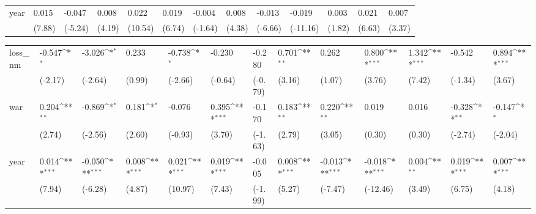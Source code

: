 \begin{tabular}{p{1.5cm} p{1.7cm} p{1.7cm} p{1.7cm} p{1.7cm} p{1.7cm} p{1.7cm} p{1.7cm} p{1.7cm} p{1.7cm} p{1.7cm} p{1.7cm} p{1.7cm}}
year            &    0.015\sym{***}&   -0.047\sym{***}&    0.008\sym{***}&    0.022\sym{***}&    0.019\sym{***}&   -0.004         &    0.008\sym{***}&   -0.013\sym{***}&   -0.019\sym{***}&    0.003         &    0.021\sym{***}&    0.007\sym{**} \\
                &   (7.88)         &  (-5.24)         &   (4.19)         &  (10.54)         &   (6.74)         &  (-1.64)         &   (4.38)         &  (-6.66)         & (-11.16)         &   (1.82)         &   (6.63)         &   (3.37)         \\
\end{tabular}
\def\sym#1{\ifmmode^{#1}\else\(^{#1}\)\fi}
\begin{tabular}{p{1.5cm} p{1.7cm} p{1.7cm} p{1.7cm} p{1.7cm} p{1.7cm} p{1.7cm} p{1.7cm} p{1.7cm} p{1.7cm} p{1.7cm} p{1.7cm} p{1.7cm}}
\hline
loss\_nm         &   -0.547\sym{*}  &   -3.026\sym{*}  &    0.233         &   -0.738\sym{*}  &   -0.230         &   -0.280         &    0.701\sym{**} &    0.262         &    0.800\sym{***}&    1.342\sym{***}&   -0.542         &    0.894\sym{***}\\
                &  (-2.17)         &  (-2.64)         &   (0.99)         &  (-2.66)         &  (-0.64)         &  (-0.79)         &   (3.16)         &   (1.07)         &   (3.76)         &   (7.42)         &  (-1.34)         &   (3.67)         \\
war             &    0.204\sym{**} &   -0.869\sym{*}  &    0.181\sym{*}  &   -0.076         &    0.395\sym{***}&   -0.170         &    0.183\sym{**} &    0.220\sym{**} &    0.019         &    0.016         &   -0.328\sym{**} &   -0.147\sym{*}  \\
                &   (2.74)         &  (-2.56)         &   (2.60)         &  (-0.93)         &   (3.70)         &  (-1.63)         &   (2.79)         &   (3.05)         &   (0.30)         &   (0.30)         &  (-2.74)         &  (-2.04)         \\
year            &    0.014\sym{***}&   -0.050\sym{***}&    0.008\sym{***}&    0.021\sym{***}&    0.019\sym{***}&   -0.005         &    0.008\sym{***}&   -0.013\sym{***}&   -0.018\sym{***}&    0.004\sym{**} &    0.019\sym{***}&    0.007\sym{***}\\
                &   (7.94)         &  (-6.28)         &   (4.87)         &  (10.97)         &   (7.43)         &  (-1.99)         &   (5.27)         &  (-7.47)         & (-12.46)         &   (3.49)         &   (6.75)         &   (4.18)         \\
\end{tabular}
